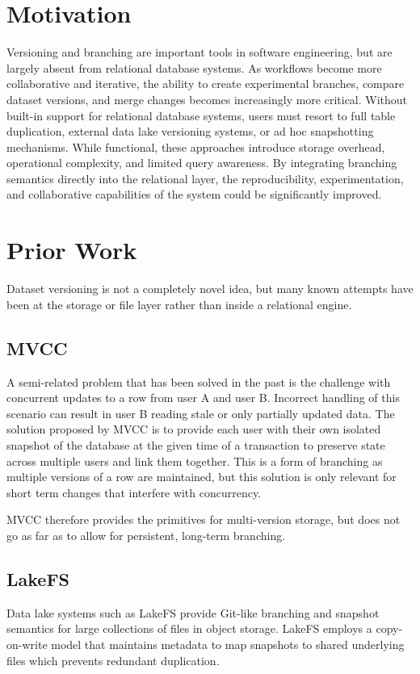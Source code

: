 \documentclass[sigplan, nonacm]{acmart}
\begin{document}
\section{Motivation}
Versioning and branching are important tools in software engineering, but are largely absent from relational database systems. As workflows become more collaborative and iterative, the ability to create experimental branches, compare dataset versions, and merge changes becomes increasingly more critical. Without built-in support for relational database systems, users must resort to full table duplication, external data lake versioning systems, or ad hoc snapshotting mechanisms. While functional, these approaches introduce storage overhead, operational complexity, and limited query awareness. By integrating branching semantics directly into the relational layer, the reproducibility, experimentation, and collaborative capabilities of the system could be significantly improved.

\section{Prior Work}

Dataset versioning is not a completely novel idea, but many known attempts have been at the storage or file layer rather than inside a relational engine.

\subsection{MVCC}
A semi-related problem that has been solved in the past is the challenge with concurrent updates to a row from user A and user B. Incorrect handling of this scenario can result in user B reading stale or only partially updated data. The solution proposed by MVCC \cite{ssi} is to provide each user with their own isolated snapshot of the database at the given time of a transaction to preserve state across multiple users and link them together. This is a form of branching as multiple versions of a row are maintained, but this solution is only relevant for short term changes that interfere with concurrency.

MVCC therefore provides the primitives for multi-version storage, but does not go as far as to allow for persistent, long-term branching.

\subsection{LakeFS}
Data lake systems such as LakeFS \cite{lakefs} provide Git-like branching and snapshot semantics for large collections of files in object storage. LakeFS employs a copy-on-write model that maintains metadata to map snapshots to shared underlying files which prevents redundant duplication.
\end{document}
